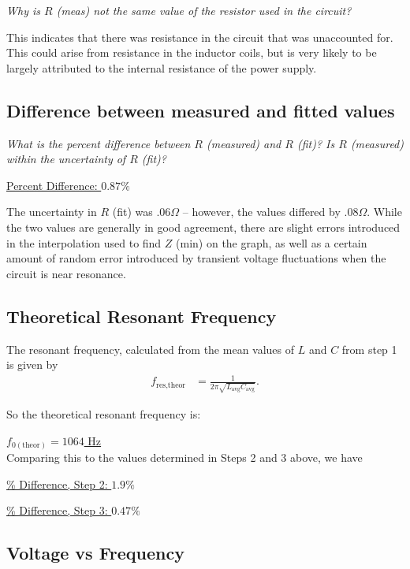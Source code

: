 \documentclass[twocolumn,english]{IEEEtran}
\theoremstyle{plain}
\theoremstyle{plain}
\begin{document}
\textit{Why is $R$ (meas) not the same value of the resistor used in the circuit?}

This indicates that there was resistance in the circuit that was unaccounted for. This could arise from resistance in the inductor coils, but is very likely to be largely attributed to the internal resistance of the power supply.

\hrulefill

\subsection{Difference between measured and fitted values}

\textit{What is the percent difference between $R$ (measured) and $R$ (fit)? Is $R$ (measured) within the uncertainty of $R$ (fit)?}

\hfill\underline{Percent Difference: $0.87\%$}

The uncertainty in $R$ (fit) was $.06\Omega$ -- however, the values differed by $.08\Omega$. While the two values are generally in good agreement, there are slight errors introduced in the interpolation used to find $Z$ (min) on the graph, as well as a certain amount of random error introduced by transient voltage fluctuations when the circuit is near resonance.

\hrulefill

\subsection{Theoretical Resonant Frequency}
The resonant frequency, calculated from the mean values of $L$ and $C$ from step 1 is given by
\begin{align}
	f_{\text{res,theor}} &= \frac{1}{2\pi\sqrt{L_{\text{avg}} C_{\text{avg}}}}.
\end{align}

So the theoretical resonant frequency is:

\hfill\underline{$f_{0(\text{theor})} = 1064$ Hz} \\

Comparing this to the values determined in Steps 2 and 3 above, we have

\hfill\underline{\% Difference, Step 2: $1.9\%$}

\hfill\underline{\% Difference, Step 3: $0.47\%$}

\hrulefill

\subsection{Voltage vs Frequency}
\end{document}
